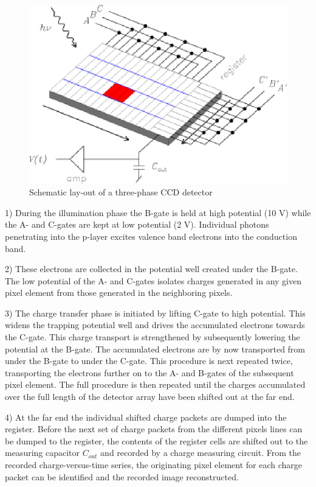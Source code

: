 \documentclass{article}
\begin{document}
\begin{figure}[h]
  \centering
	\includegraphics{CCD_schematic.eps}
  \caption{Schematic lay-out of a three-phase CCD detector}
  \label{CCD.figschematic}
\end{figure}

1) During the illumination phase the B-gate is held at high potential
(10 V) while the A- and C-gates are kept at low potential (2
V). Individual photons penetrating into the p-layer excites valence
band electrons into the conduction band. 

2) These electrons are collected in the potential well created under
the B-gate. The low potential of the A- and C-gates isolates charges
generated in any given pixel element from those generated in the
neighboring pixels.

3) The charge transfer phase is initiated by lifting C-gate to high
potential. This widens the trapping potential well and drives the
accumulated electrons towards the C-gate. This charge transport is
strengthened by subsequently lowering the potential at the B-gate. The
accumulated electrons are by now transported from under the B-gate to
under the C-gate. This procedure is next repeated twice, transporting
the electrons further on to the A- and B-gates of the subsequent pixel
element. The full procedure is then repeated until the charges
accumulated over the full length of the detector array have been
shifted out at the far end.

4) At the far end the individual shifted charge packets are dumped into
the register. Before the next set of charge packets from the different
pixels lines can be dumped to the register, the contents of the
register cells are shifted out to the measuring capacitor $C_{out}$ and
recorded by a charge measuring circuit. From the recorded
charge-versus-time series, the originating pixel element for each
charge packet can be identified and the recorded image reconstructed.
\end{document}
